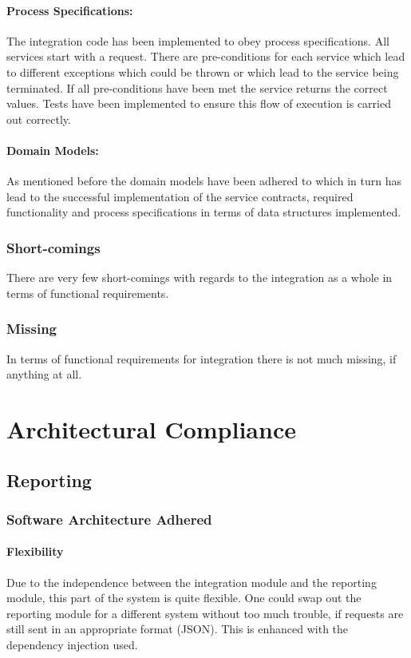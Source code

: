 \documentclass{article}
\begin{document}
			\paragraph{Process Specifications:}
			The integration code has been implemented to obey process specifications. 
			All services start with a request. There are pre-conditions for each service which lead to different exceptions which could be thrown or which lead to the service being terminated.
			If all pre-conditions have been met the service returns the correct values. Tests have been implemented to ensure this flow of execution is carried out correctly.
			\paragraph{Domain Models:}
			As mentioned before the domain models have been adhered to which in turn has lead to the successful implementation of the service contracts, required functionality and process specifications in terms of data structures implemented.
		\subsubsection{Short-comings}
			There are very few short-comings with regards to the integration as a whole in terms of functional requirements.
		\subsubsection{Missing}
			In terms of functional requirements for integration there is not much missing, if anything at all.
			
\cleardoublepage			
			
\section{Architectural Compliance}
    \subsection{Reporting}
        \subsubsection{Software Architecture Adhered}
            \paragraph{Flexibility}
            Due to the independence between the integration module and the reporting module, this part of the system is quite flexible. One could swap out the reporting module for a different system without too much trouble, if requests are still sent in an appropriate format (JSON). This is enhanced with the dependency injection used.   
\end{document}
